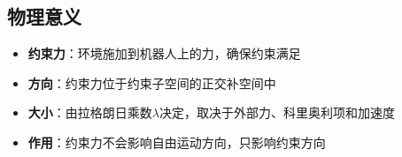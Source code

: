 \documentclass[12pt,a4paper]{article}
\begin{document}
\subsection{物理意义}

\begin{itemize}
\item \textbf{约束力}：环境施加到机器人上的力，确保约束满足
\item \textbf{方向}：约束力位于约束子空间的正交补空间中
\item \textbf{大小}：由拉格朗日乘数$\lambda$决定，取决于外部力、科里奥利项和加速度
\item \textbf{作用}：约束力不会影响自由运动方向，只影响约束方向
\end{itemize}
\end{document}
